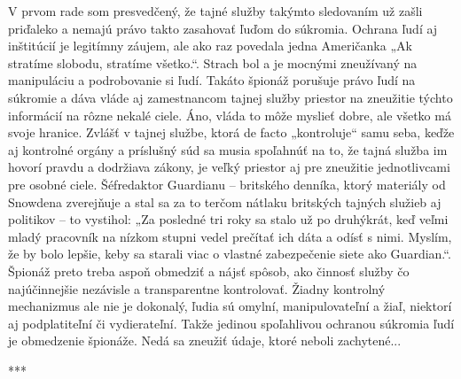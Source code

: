 \documentclass{article}
\begin{document}
V prvom rade som presvedčený, že tajné služby takýmto sledovaním už zašli priďaleko a nemajú právo takto zasahovať ľuďom do súkromia. Ochrana ľudí aj inštitúcií je legitímny záujem, ale ako raz povedala jedna Američanka „Ak stratíme slobodu, stratíme všetko.“. Strach bol a je mocnými zneužívaný na manipuláciu a podrobovanie si ľudí. Takáto špionáž porušuje právo ľudí na súkromie a dáva vláde aj zamestnancom tajnej služby priestor na zneužitie týchto informácií na rôzne nekalé ciele. Áno, vláda to môže myslieť dobre, ale všetko má svoje hranice. Zvlášť v tajnej službe, ktorá de facto „kontroluje“ samu seba, keďže aj kontrolné orgány a príslušný súd sa musia spoľahnúť na to, že tajná služba im hovorí pravdu a dodržiava zákony, je veľký priestor aj pre zneužitie jednotlivcami pre osobné ciele. Šéfredaktor Guardianu – britského denníka, ktorý materiály od Snowdena zverejňuje a stal sa za to terčom nátlaku britských tajných služieb aj politikov – to vystihol: „Za posledné tri roky sa stalo už po druhýkrát, keď veľmi mladý pracovník na nízkom stupni vedel prečítať ich dáta a odísť s nimi. Myslím, že by bolo lepšie, keby sa starali viac o vlastné zabezpečenie siete ako Guardian.“. Špionáž preto treba aspoň obmedziť a nájsť spôsob, ako činnosť služby čo najúčinnejšie nezávisle a transparentne kontrolovať. Žiadny kontrolný mechanizmus ale nie je dokonalý, ľudia sú omylní, manipulovateľní a žiaľ, niektorí aj podplatiteľní či vydierateľní. Takže jedinou spoľahlivou ochranou súkromia ľudí je obmedzenie špionáže. Nedá sa zneužiť údaje, ktoré neboli zachytené...

\begin{center}
	***
\end{center}
\end{document}

